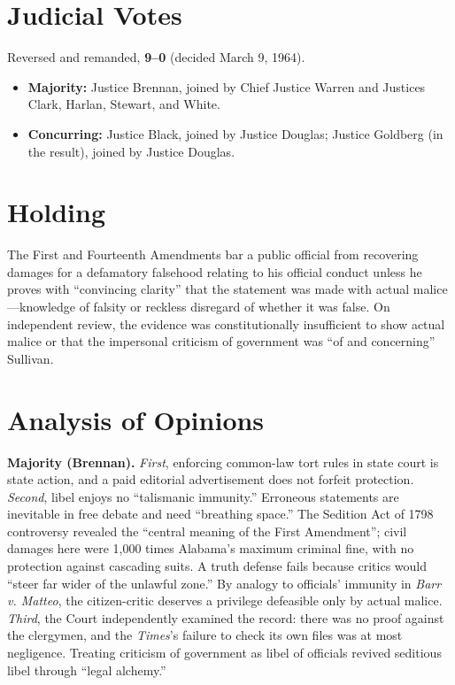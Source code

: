 \documentclass[12pt]{article}
\begin{document}
\section{Judicial Votes}

Reversed and remanded, \textbf{9--0} (decided March 9, 1964).
\begin{itemize}
\item \textbf{Majority:} Justice Brennan, joined by Chief Justice Warren and Justices Clark, Harlan, Stewart, and White.
\item \textbf{Concurring:} Justice Black, joined by Justice Douglas; Justice Goldberg (in the result), joined by Justice Douglas.
\end{itemize}

\section{Holding}

The First and Fourteenth Amendments bar a public official from recovering damages for a defamatory falsehood relating to his official conduct unless he proves with ``convincing clarity'' that the statement was made with actual malice---knowledge of falsity or reckless disregard of whether it was false. On independent review, the evidence was constitutionally insufficient to show actual malice or that the impersonal criticism of government was ``of and concerning'' Sullivan.

\section{Analysis of Opinions}

\textbf{Majority (Brennan).} \emph{First}, enforcing common-law tort rules in state court is state action, and a paid editorial advertisement does not forfeit protection. \emph{Second}, libel enjoys no ``talismanic immunity.'' Erroneous statements are inevitable in free debate and need ``breathing space.'' The Sedition Act of 1798 controversy revealed the ``central meaning of the First Amendment''; civil damages here were 1,000 times Alabama's maximum criminal fine, with no protection against cascading suits. A truth defense fails because critics would ``steer far wider of the unlawful zone.'' By analogy to officials' immunity in \textit{Barr v. Matteo}, the citizen-critic deserves a privilege defeasible only by actual malice. \emph{Third}, the Court independently examined the record: there was no proof against the clergymen, and the \textit{Times}'s failure to check its own files was at most negligence. Treating criticism of government as libel of officials revived seditious libel through ``legal alchemy.''
\end{document}
